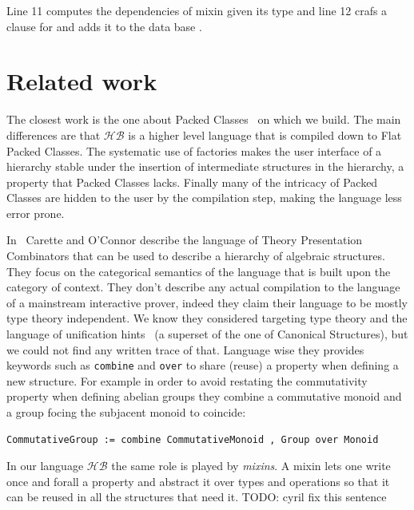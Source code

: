 \documentclass[a4paper,UKenglish,cleveref, autoref]{lipics-v2019}
\newcommand{\HB}{\ensuremath{\mathcal{HB}}}
\newcommand{\mixin}{mixin}
\newcommand{\factories}{factories}
\theoremstyle{implem}
\theoremstyle{implem}
\theoremstyle{axiom}
\theoremstyle{abscommand}
\theoremstyle{command}
\begin{document}
{{Line 11 computes the dependencies of \mixin{}  given
its type and line 12 crafs a clause for  and
adds it to the data base .


\section{Related work}
The closest work is the one about Packed Classes~\cite{DBLP:conf/tphol/GarillotGMR09} on which we
build. The main differences are that \HB{} is a higher level language
that is compiled down to Flat Packed Classes. The systematic use of
\factories{} makes the user interface of a hierarchy stable under the insertion of
intermediate structures in the hierarchy, a property that Packed Classes lacks.
Finally many of the intricacy of Packed Classes are hidden to the user by
the compilation step, making the language less error prone.

In~\cite{CaretteCombinators} Carette and O'Connor describe the language of
Theory Presentation Combinators that can be used to describe a hierarchy of
algebraic structures.
They focus on the categorical semantics of the language that is built upon
the category of context.
They don't describe any actual compilation to the language of a mainstream
interactive prover, indeed they claim their language to be mostly type theory
independent. We know they considered targeting type theory and the language
of unification hints~\cite{10.1007/978-3-642-03359-9_8}
(a superset of the one of Canonical Structures),
but we could not find any written trace of that. Language wise they provides
keywords such as \verb+combine+ and \verb+over+ to share (reuse) a property
when defining a new structure. For example in order to avoid restating
the commutativity property when defining abelian groups they combine
a commutative monoid and a group focing the subjacent monoid to coincide:
\begin{verbatim}
CommutativeGroup := combine CommutativeMonoid , Group over Monoid
\end{verbatim}
In our language \HB{} the same role is played by \emph{mixins}.
A \mixin{} lets one write once and forall a property and abstract it over types
and operations so that it can be reused in all the structures that need it.
TODO: cyril fix this sentence

}}
\end{document}
